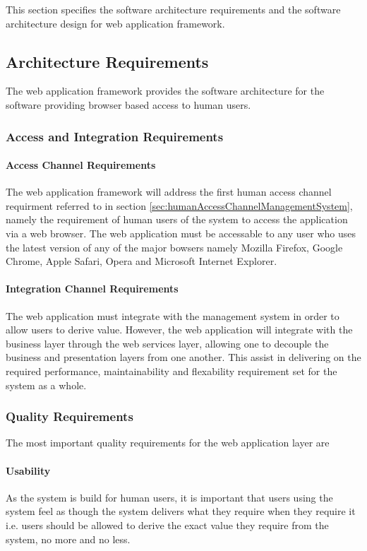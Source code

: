 This section specifies the software architecture requirements and the software
architecture design for web application framework.

\subsection{Architecture Requirements}
The web application framework provides the software architecture for the software
providing browser based access to human users.

\subsubsection{Access and Integration Requirements}
\paragraph{Access Channel Requirements}
The web application framework will address the first human access channel requirment
referred to in section \ref{sec:humanAccessChannelManagementSystem},
namely the requirement of human users of the system to access the application
via a web browser. The web application must be accessable to any user who uses
the latest version of any of the major bowsers namely Mozilla Firefox, 
Google Chrome, Apple Safari, Opera and Microsoft Internet Explorer.

\paragraph{Integration Channel Requirements}
The web application must integrate with the management system in order to allow
users to derive value. However, the web application will integrate with the
business layer through the web services layer, allowing one to decouple the
business and presentation layers from one another. This assist in delivering on
the required performance, maintainability and flexability requirement set for
the system as a whole.

\subsubsection{Quality Requirements}
The most important quality requirements for the web application layer are
\paragraph{Usability}
As the system is build for human users, it is important that users using the
system feel as though the system delivers what they require when they
require it i.e. users should be allowed to derive the exact value they require
from the system, no more and no less.

